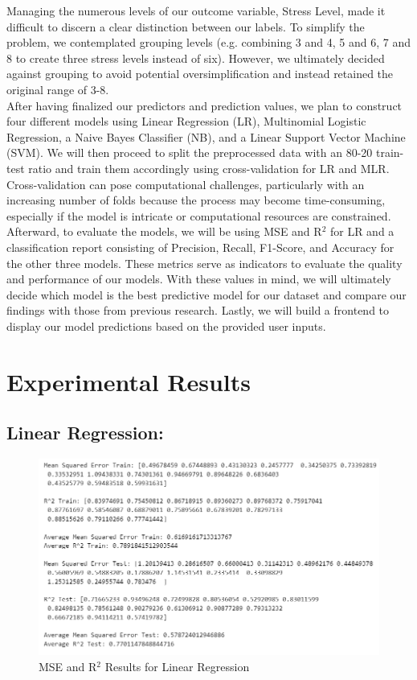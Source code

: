 \documentclass[11pt, letterpaper]{article}
\begin{document}
    \noindent Managing the numerous levels of our outcome variable, Stress Level, made it difficult to discern a clear distinction between our labels. To simplify the problem, we contemplated grouping levels (e.g. combining 3 and 4, 5 and 6, 7 and 8 to create three stress levels instead of six). However, we ultimately decided against grouping to avoid potential oversimplification and instead retained the original range of 3-8.\\

    \noindent After having finalized our predictors and prediction values, we plan to construct four different models using Linear Regression (LR), Multinomial Logistic Regression, a Naive Bayes Classifier (NB), and a Linear Support Vector Machine (SVM). We will then proceed to split the preprocessed data with an 80-20 train-test ratio and train them accordingly using cross-validation for LR and MLR. Cross-validation can pose computational challenges, particularly with an increasing number of folds because the process may become time-consuming, especially if the model is intricate or computational resources are constrained.\\

    \noindent Afterward, to evaluate the models, we will be using MSE and R$^2$ for LR and a classification report consisting of Precision, Recall, F1-Score, and Accuracy for the other three models. These metrics serve as indicators to evaluate the quality and performance of our models. With these values in mind, we will ultimately decide which model is the best predictive model for our dataset and compare our findings with those from previous research. Lastly, we will build a frontend to display our model predictions based on the provided user inputs.
    
    \section*{Experimental Results}

    \noindent\subsection*{Linear Regression:}

    \begin{figure}[H]
        \centering
        \includegraphics[width=\columnwidth]{lr-report.png}
        \caption{MSE and R$^2$ Results for Linear Regression}
        \label{fig:class-report-lr}
    \end{figure}
\end{document}
